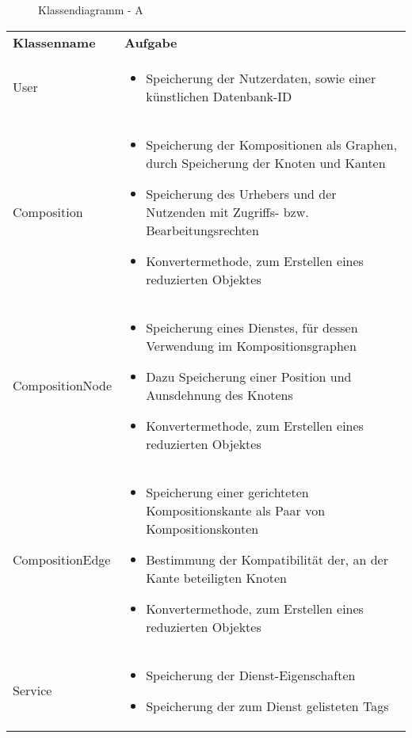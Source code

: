 \begin{figure}[h]
	\centering
	\caption{Klassendiagramm - A}
	\label{fig:klassendiagramm-a}
\end{figure}

\begin{table}[h]
	\centering	
	\begin{tabularx}{\textwidth}{X X}
		\rowcolor[HTML]{C0C0C0} 
		\textbf{Klassenname} & \textbf{Aufgabe} \\
		User & \begin{itemize}
			\item Speicherung der Nutzerdaten, sowie einer künstlichen Datenbank-ID
		\end{itemize}\\
		\rowcolor[HTML]{E7E7E7} 
		Composition & \begin{itemize}
			\item Speicherung der Kompositionen als Graphen, durch Speicherung der Knoten und Kanten
			\item Speicherung des Urhebers und der Nutzenden mit Zugriffs- bzw. Bearbeitungsrechten 
			\item Konvertermethode, zum Erstellen eines reduzierten Objektes
		\end{itemize} \\
		CompositionNode & \begin{itemize}
			\item Speicherung eines Dienstes, für dessen Verwendung im Kompositionsgraphen
			\item Dazu Speicherung einer Position und Aunsdehnung des Knotens
			\item Konvertermethode, zum Erstellen eines reduzierten Objektes
		\end{itemize} \\
		\rowcolor[HTML]{E7E7E7} 
		CompositionEdge & \begin{itemize}
			\item Speicherung einer gerichteten Kompositionskante als Paar von Kompositionskonten
			\item Bestimmung der Kompatibilität der, an der Kante beteiligten Knoten
			\item Konvertermethode, zum Erstellen eines reduzierten Objektes
		\end{itemize} \\
		Service & \begin{itemize}
			\item Speicherung der Dienst-Eigenschaften 
			\item Speicherung der zum Dienst gelisteten Tags

\end{itemize}
\end{tabularx}
\end{table}
